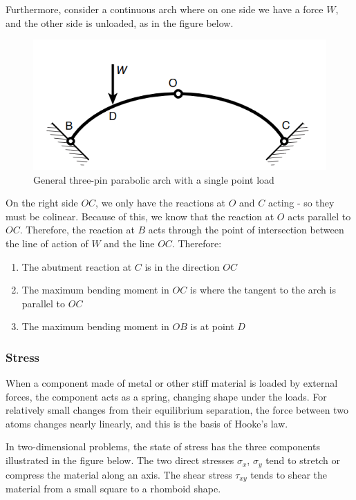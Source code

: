 \documentclass{article}
\begin{document}
Furthermore, consider a continuous arch where on one side we have a force $W$, and the other side is unloaded, as in the figure below.

\begin{figure}[h]
    \centering
    \includegraphics{images/contarch2.png}
    \caption{General three-pin parabolic arch with a single point load}
    \label{fig:enter-label}
\end{figure}

On the right side $OC$, we only have the reactions at $O$ and $C$ acting - so they must be colinear. Because of this, we know that the reaction at $O$ acts parallel to $OC$. Therefore, the reaction at $B$ acts through the point of intersection between the line of action of $W$ and the line $OC$. Therefore:

\begin{enumerate}
    \item The abutment reaction at $C$ is in the direction $OC$
    \item The maximum bending moment in $OC$ is where the tangent to the arch is parallel to $OC$
    \item The maximum bending moment in $OB$ is at point $D$
\end{enumerate}

\subsubsection{Stress}

When a component made of metal or other stiff material is loaded by external forces, the component acts as a spring, changing shape under the loads. For relatively small changes from their equilibrium separation, the force between two atoms changes nearly linearly, and this is the basis of Hooke's law.

In two-dimensional problems, the state of stress has the three components illustrated in the figure below. The two direct stresses $\sigma_x$, $\sigma_y$ tend to stretch or compress the material along an axis. The shear stress $\tau_{xy}$ tends to shear the material from a small square to a rhomboid shape.
\end{document}
